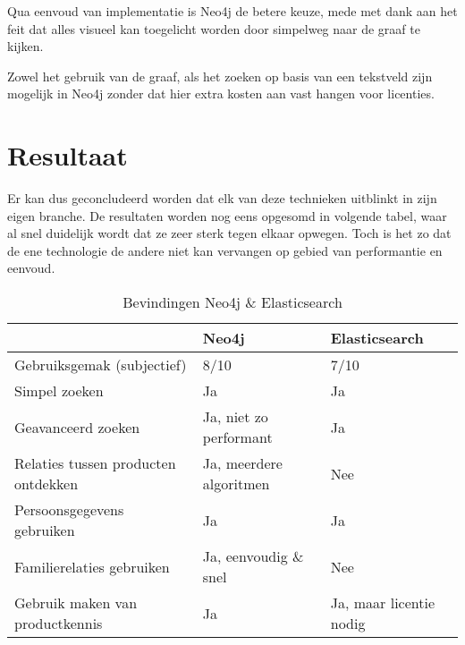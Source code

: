 Qua eenvoud van implementatie is Neo4j de betere keuze, mede met dank aan het feit dat alles visueel kan toegelicht worden door simpelweg naar de graaf te kijken. 

Zowel het gebruik van de graaf, als het zoeken op basis van een tekstveld zijn mogelijk in Neo4j zonder dat hier extra kosten aan vast hangen voor licenties. 

\section{Resultaat}
\label{sec:Resultaat}

Er kan dus geconcludeerd worden dat elk van deze technieken uitblinkt in zijn eigen branche. De resultaten worden nog eens opgesomd in volgende tabel, waar al snel duidelijk wordt dat ze zeer sterk tegen elkaar opwegen. Toch is het zo dat de ene technologie de andere niet kan vervangen op gebied van performantie en eenvoud.

\begin{table}[hbt!]
	\begin{tabular}{l|l|l|}
		\cline{2-3}
		& \cellcolor[HTML]{C0C0C0}Neo4j & \cellcolor[HTML]{C0C0C0}Elasticsearch \\ \hline
		\multicolumn{1}{|l|}{\cellcolor[HTML]{EFEFEF}Gebruiksgemak (subjectief)}      & 8/10                          & 7/10                                  \\ \hline
		\multicolumn{1}{|l|}{\cellcolor[HTML]{EFEFEF}Simpel zoeken}                   & Ja                            & Ja                                    \\ \hline
		\multicolumn{1}{|l|}{\cellcolor[HTML]{EFEFEF}Geavanceerd zoeken}              & Ja, niet zo performant        & Ja                                    \\ \hline
		\multicolumn{1}{|l|}{\cellcolor[HTML]{EFEFEF}Relaties tussen producten ontdekken}              & Ja, meerdere algoritmen       & Nee                    \\ \hline
		\multicolumn{1}{|l|}{\cellcolor[HTML]{EFEFEF}Persoonsgegevens gebruiken}              & Ja    & Ja                    \\ \hline
		\multicolumn{1}{|l|}{\cellcolor[HTML]{EFEFEF}Familierelaties gebruiken}       & Ja, eenvoudig \& snel         & Nee          \\ \hline
		\multicolumn{1}{|l|}{\cellcolor[HTML]{EFEFEF}Gebruik maken van productkennis} & Ja                            & Ja, maar licentie nodig               \\ \hline
	\end{tabular}
	\caption{\label{tab: Bevindingen Neo4j & Elasticsearch} Bevindingen Neo4j \& Elasticsearch}
\end{table}


